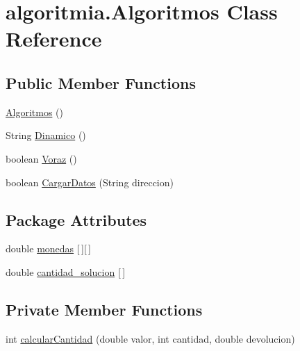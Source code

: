\hypertarget{classalgoritmia_1_1_algoritmos}{}\section{algoritmia.\+Algoritmos Class Reference}
\label{classalgoritmia_1_1_algoritmos}
\subsection*{Public Member Functions}
\begin{DoxyCompactItemize}
\item 
\mbox{\hyperlink{classalgoritmia_1_1_algoritmos_a1ecfcbbdfa9fe28357385a28d24677e9}{Algoritmos}} ()
\item 
String \mbox{\hyperlink{classalgoritmia_1_1_algoritmos_a673473cfeaecd827c7345fb929e19464}{Dinamico}} ()
\item 
boolean \mbox{\hyperlink{classalgoritmia_1_1_algoritmos_a2c160a1d7cd8443433d2b8fc72148304}{Voraz}} ()
\item 
boolean \mbox{\hyperlink{classalgoritmia_1_1_algoritmos_a3b4d1e52cfec7e78cb42208bf63a4f65}{Cargar\+Datos}} (String direccion)
\end{DoxyCompactItemize}
\subsection*{Package Attributes}
\begin{DoxyCompactItemize}
\item 
double \mbox{\hyperlink{classalgoritmia_1_1_algoritmos_a3f6bbaa8358a204e6dc486d7e818146f}{monedas}} \mbox{[}$\,$\mbox{]}\mbox{[}$\,$\mbox{]}
\item 
double \mbox{\hyperlink{classalgoritmia_1_1_algoritmos_a3c4b89e8f06344f051f0812d67d2fe42}{cantidad\+\_\+solucion}} \mbox{[}$\,$\mbox{]}
\end{DoxyCompactItemize}
\subsection*{Private Member Functions}
\begin{DoxyCompactItemize}
\item 
int \mbox{\hyperlink{classalgoritmia_1_1_algoritmos_a7c37ed16dedcd133fa5a9a7dec5a734a}{calcular\+Cantidad}} (double valor, int cantidad, double devolucion)
\end{DoxyCompactItemize}
